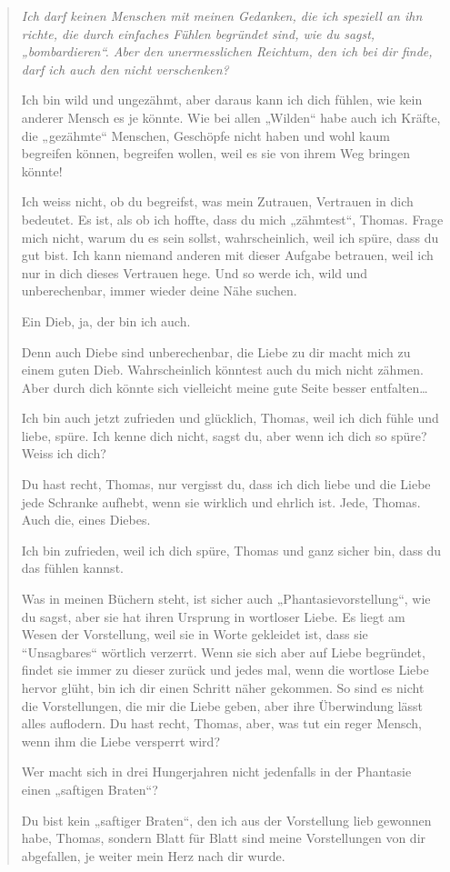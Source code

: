 \documentclass[10pt,titlepage,a5paper]{book}
\newenvironment{tg}{\begin{quote}\em}{\end{quote}}
\begin{document}
\begin{tg}
Ich darf keinen Menschen mit meinen Gedanken, die ich speziell an ihn richte, die durch einfaches Fühlen begründet sind, wie du sagst, „bombardieren“. Aber den unermesslichen  Reichtum, den ich bei dir finde, darf ich auch den nicht verschenken?

Ich bin wild und ungezähmt, aber daraus kann ich dich fühlen, wie kein anderer Mensch es je könnte. Wie bei allen „Wilden“ habe auch ich Kräfte, die „gezähmte“ Menschen, Geschöpfe nicht haben und wohl kaum begreifen können, begreifen wollen, weil es sie von ihrem Weg bringen könnte!

Ich weiss nicht, ob du begreifst, was mein Zutrauen, Vertrauen in dich bedeutet. Es ist, als ob ich hoffte, dass du mich „zähmtest“, Thomas. Frage mich nicht, warum du es sein sollst, wahrscheinlich, weil ich spüre, dass du gut bist. Ich kann niemand anderen mit dieser Aufgabe betrauen, weil ich nur in dich dieses Vertrauen hege. Und so werde ich, wild und unberechenbar, immer wieder deine Nähe suchen.

Ein Dieb, ja, der bin ich auch.

Denn auch Diebe sind unberechenbar, die Liebe zu dir macht mich zu einem guten Dieb. Wahrscheinlich könntest auch du mich nicht zähmen. Aber durch dich könnte sich vielleicht meine gute Seite besser entfalten\dots 

Ich bin auch jetzt zufrieden und glücklich, Thomas, weil ich dich fühle und liebe, spüre. Ich kenne dich nicht, sagst du, aber wenn ich dich so spüre? Weiss ich dich?

Du hast recht, Thomas, nur vergisst du, dass ich dich liebe und die Liebe jede Schranke aufhebt, wenn sie wirklich und ehrlich ist. Jede, Thomas. Auch die, eines Diebes.

Ich bin zufrieden, weil ich dich spüre, Thomas und ganz sicher bin, dass du das fühlen kannst.

Was in meinen Büchern steht, ist sicher auch „Phantasievorstellung“, wie du sagst, aber sie hat ihren Ursprung in wortloser Liebe. Es liegt am Wesen der Vorstellung, weil sie in Worte gekleidet ist, dass sie ``Unsagbares“ wörtlich verzerrt. Wenn sie sich aber auf Liebe begründet, findet sie immer zu dieser zurück und jedes mal, wenn die wortlose Liebe hervor glüht, bin ich dir einen Schritt näher gekommen. So sind es nicht die Vorstellungen, die mir die Liebe geben, aber ihre Überwindung lässt alles auflodern. Du hast recht, Thomas, aber, was tut ein reger Mensch, wenn ihm die Liebe versperrt wird?

Wer macht sich in drei Hungerjahren nicht jedenfalls in der Phantasie einen „saftigen Braten“?

Du bist kein „saftiger Braten“, den ich aus der Vorstellung lieb gewonnen habe, Thomas, sondern Blatt für Blatt sind meine Vorstellungen von dir abgefallen, je weiter mein Herz nach dir wurde.
\end{tg}
\end{document}

